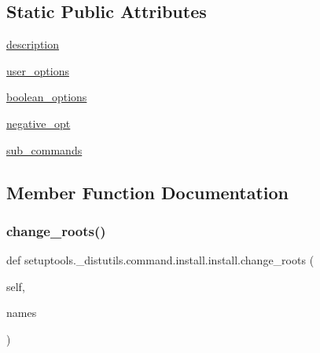 \subsection*{Static Public Attributes}
\begin{DoxyCompactItemize}
\item 
\hyperlink{classsetuptools_1_1__distutils_1_1command_1_1install_1_1install_a634f0ee9b2605b1ac280d65465ea2646}{description}
\item 
\hyperlink{classsetuptools_1_1__distutils_1_1command_1_1install_1_1install_aa11de52b5d433be0b3c9953e9ceb73e2}{user\+\_\+options}
\item 
\hyperlink{classsetuptools_1_1__distutils_1_1command_1_1install_1_1install_afeb35eec2cd46b36b6dec4f058e20aec}{boolean\+\_\+options}
\item 
\hyperlink{classsetuptools_1_1__distutils_1_1command_1_1install_1_1install_ac1b339487651a68c71f326084267edce}{negative\+\_\+opt}
\item 
\hyperlink{classsetuptools_1_1__distutils_1_1command_1_1install_1_1install_a25ebaad08b1a67c430fbae6d80162b4c}{sub\+\_\+commands}
\end{DoxyCompactItemize}


\subsection{Member Function Documentation}
\mbox{\label{classsetuptools_1_1__distutils_1_1command_1_1install_1_1install_a74f0fc4bffdbca57c34e331c57f17e05}} 
\subsubsection{\texorpdfstring{change\+\_\+roots()}{change\_roots()}}
{\footnotesize\ttfamily def setuptools.\+\_\+distutils.\+command.\+install.\+install.\+change\+\_\+roots (\begin{DoxyParamCaption}\item[{}]{self,  }\item[{}]{names }\end{DoxyParamCaption})}


